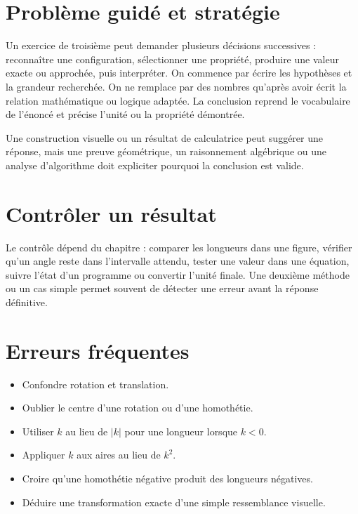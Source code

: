 \section{Problème guidé et stratégie}
Un exercice de troisième peut demander plusieurs décisions successives : reconnaître une configuration, sélectionner une propriété, produire une valeur exacte ou approchée, puis interpréter. On commence par écrire les hypothèses et la grandeur recherchée. On ne remplace par des nombres qu’après avoir écrit la relation mathématique ou logique adaptée. La conclusion reprend le vocabulaire de l’énoncé et précise l’unité ou la propriété démontrée.

\begin{attention}
Une construction visuelle ou un résultat de calculatrice peut suggérer une réponse, mais une preuve géométrique, un raisonnement algébrique ou une analyse d’algorithme doit expliciter pourquoi la conclusion est valide.
\end{attention}

\section{Contrôler un résultat}
Le contrôle dépend du chapitre : comparer les longueurs dans une figure, vérifier qu’un angle reste dans l’intervalle attendu, tester une valeur dans une équation, suivre l’état d’un programme ou convertir l’unité finale. Une deuxième méthode ou un cas simple permet souvent de détecter une erreur avant la réponse définitive.

\section{Erreurs fréquentes}
\begin{itemize}
\item Confondre rotation et translation.
\item Oublier le centre d’une rotation ou d’une homothétie.
\item Utiliser $k$ au lieu de $|k|$ pour une longueur lorsque $k<0$.
\item Appliquer $k$ aux aires au lieu de $k^2$.
\item Croire qu’une homothétie négative produit des longueurs négatives.
\item Déduire une transformation exacte d’une simple ressemblance visuelle.
\end{itemize}

